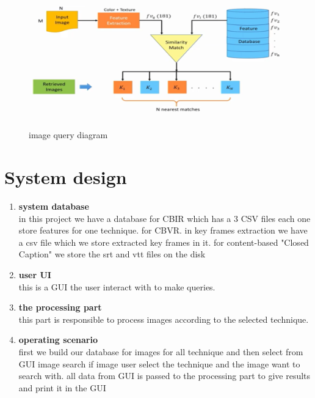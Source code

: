 \documentclass[pdftex,10pt,a4paper,oneside]{article}
\begin{document}
\begin{figure}[H]
	\centering
	\includegraphics[width=120mm,height=60mm]{fig/20.png}
	\caption{image query diagram }
	\label{image query diagram}
\end{figure}
	\pagebreak
	\section{System design}
	\begin{enumerate}
		\item  \textbf{{\large system database}}\\
		in this project we have a database for CBIR which has a 3 CSV files each one store features for one technique.
		for CBVR. in key frames extraction we have a csv file which we store extracted key frames in it. for content-based "Closed Caption" we store the srt and vtt files on the disk
		
		\item \textbf{{\large user UI}} \\
		this is a GUI the user interact with to make queries.
		\item \textbf{{\large the processing part}}\\
		this part is responsible to process images according to the selected technique.
		\item \textbf{{\large  operating scenario}}\\
		 first we build our database for  images for all technique and then select from GUI  image search if image user select the technique and the image want to search with. all data from GUI is passed to the processing part to give results and print it in the GUI  
		
	\end{enumerate}
	
	
	 
	
	
	
	\pagebreak
\end{document}
